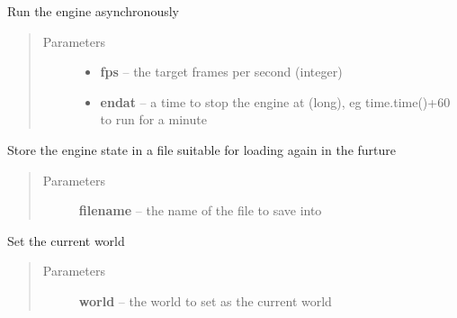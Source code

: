 \documentclass[letterpaper,10pt,english]{sphinxmanual}
\begin{document}
\begin{fulllineitems}
\begin{fulllineitems}
\begin{quote}
\begin{description}
\begin{itemize}
\end{itemize}

\end{description}\end{quote}

\end{fulllineitems}


\begin{fulllineitems}
\label{engine:serge.engine.Engine.runAsync}
Run the engine asynchronously
\begin{quote}\begin{description}
\item[{Parameters}] \leavevmode\begin{itemize}
\item {} 
\textbf{fps} -- the target frames per second (integer)

\item {} 
\textbf{endat} -- a time to stop the engine at (long), eg time.time()+60 to run for a minute

\end{itemize}

\end{description}\end{quote}

\end{fulllineitems}


\begin{fulllineitems}
\label{engine:serge.engine.Engine.save}
Store the engine state in a file suitable for loading again in the furture
\begin{quote}\begin{description}
\item[{Parameters}] \leavevmode
\textbf{filename} -- the name of the file to save into

\end{description}\end{quote}

\end{fulllineitems}


\begin{fulllineitems}
\label{engine:serge.engine.Engine.setCurrentWorld}
Set the current world
\begin{quote}\begin{description}
\item[{Parameters}] \leavevmode
\textbf{world} -- the world to set as the current world


\end{description}
\end{quote}
\end{fulllineitems}
\end{fulllineitems}
\end{document}
